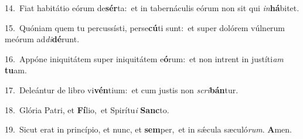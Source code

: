 {\numbfont\textcolor{\numbcolor}{14.}}~Fiat habitátio eórum de\-\textbf{sér}\-ta:~\star et in tabernáculis eórum non sit qui \textit{in}\-\textbf{há}bitet.\par
{\numbfont\textcolor{\numbcolor}{15.}}~Quóniam quem tu percussísti, perse\-\textbf{cú}\-ti sunt:~\star et super dolórem vúlnerum meórum ad\-\textit{di}\-\textbf{dé}runt.\par
{\numbfont\textcolor{\numbcolor}{16.}}~Appóne iniquitátem super iniquitátem e\-\textbf{ó}\-rum:~\star et non intrent in justíti\textit{am} \textbf{tu}\-am.\par
{\numbfont\textcolor{\numbcolor}{17.}}~Deleántur de libro vi\-\textbf{vén}\-tium:~\star et cum justis non \textit{scri}\-\textbf{bán}tur.\par
{\numbfont\textcolor{\numbcolor}{18.}}~Glória Patri, et \textbf{Fí}\-lio,~\star et Spirítu\textit{i} \textbf{Sanc}\-to.\par
{\numbfont\textcolor{\numbcolor}{19.}}~Sicut erat in princípio, et nunc, et \textbf{sem}\-per,~\star et in sǽcula sæculó\-\textit{rum}\-. \textbf{A}\-men.\par
